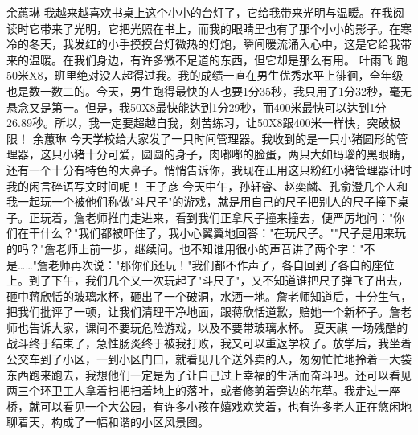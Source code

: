 {}余蕙琳\markdownRendererInterblockSeparator
{}我越来越喜欢书桌上这个小小的台灯了，它给我带来光明与温暖。在我阅读时它带来了光明，它把光照在书上，而我的眼睛里也有了那个小小的影子。在寒冷的冬天，我发红的小手摸摸台灯微热的灯炮，瞬间暖流涌入心中，这是它给我带来的温暖。在我们身边，有许多微不足道的东西，但它却是那么有用。\markdownRendererInterblockSeparator
{}\markdownRendererInterblockSeparator
{}叶雨飞\markdownRendererInterblockSeparator
{}跑50米X8，班里绝对没人超得过我。我的成绩一直在男生优秀水平上徘徊，全年级也是数一数二的。今天，男生跑得最快的人也要1分35秒，我只用了1分32秒，毫无悬念又是第一。但是，我50X8最快能达到1分29秒，而400米最快可以达到1分26.89秒。所以，我一定要超越自我，刻苦练习，让50X8跟400米一样快，突破极限！\markdownRendererInterblockSeparator
{}\markdownRendererInterblockSeparator
{}余蕙琳\markdownRendererInterblockSeparator
{}今天学校给大家发了一只时间管理器。我收到的是一只小猪圆形的管理器，这只小猪十分可爱，圆圆的身子，肉嘟嘟的脸蛋，两只大如玛瑙的黑眼睛，还有一个十分有特色的大鼻子。悄悄告诉你，我现在正用这只粉红小猪管理器计时我的闲言碎语写文时间呢！\markdownRendererInterblockSeparator
{}\markdownRendererInterblockSeparator
{}王子彦\markdownRendererInterblockSeparator
{}今天中午，孙轩睿、赵奕麟、孔俞澄几个人和我一起玩一个被他们称做"斗尺子"的游戏，就是用自己的尺子把别人的尺子撞下桌子。正玩着，詹老师推门走进来，看到我们正拿尺子撞来撞去，便严厉地问："你们在干什么？"我们都被吓住了，我小心翼翼地回答："在玩尺子。""尺子是用来玩的吗？"詹老师上前一步，继续问。也不知谁用很小的声音讲了两个字："不是……"詹老师再次说："那你们还玩！"我们都不作声了，各自回到了各自的座位上。到了下午，我们几个又一次玩起了"斗尺子"，又不知道谁把尺子弹飞了出去，砸中蒋欣恬的玻璃水杯，砸出了一个破洞，水洒一地。詹老师知道后，十分生气，把我们批评了一顿，让我们清理干净地面，跟蒋欣恬道歉，赔她一个新杯子。詹老师也告诉大家，课间不要玩危险游戏，以及不要带玻璃水杯。\markdownRendererInterblockSeparator
{}\markdownRendererInterblockSeparator
{}夏天祺\markdownRendererInterblockSeparator
{}一场残酷的战斗终于结束了，急性肠炎终于被我打败，我又可以重返学校了。放学后，我坐着公交车到了小区，一到小区门口，就看见几个送外卖的人，匆匆忙忙地拎着一大袋东西跑来跑去，我想他们一定是为了让自己过上幸福的生活而奋斗吧。还可以看见两三个环卫工人拿着扫把扫着地上的落叶，或者修剪着旁边的花草。我走过一座桥，就可以看见一个大公园，有许多小孩在嬉戏欢笑着，也有许多老人正在悠闲地聊着天，构成了一幅和谐的小区风景图。\markdownRendererInterblockSeparator
